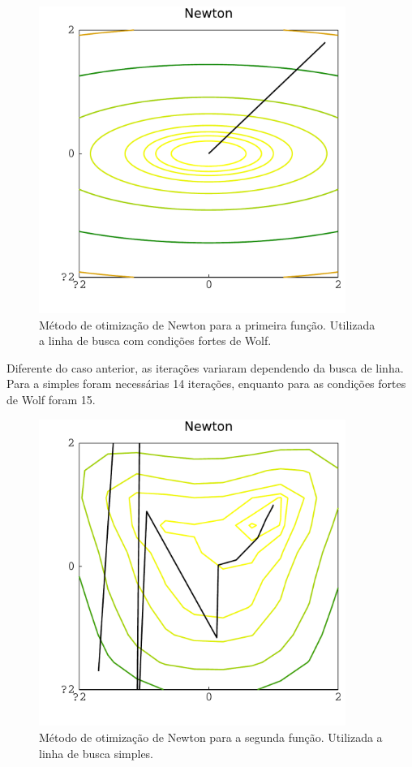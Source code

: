 \documentclass[12pt]{article}
\begin{document}
\begin{figure}[ht!]
	\centering
	\includegraphics[width=10cm]{Figuras/Newton_wolff2}
	\caption{Método de otimização de Newton para a primeira função. Utilizada a linha de busca com condições fortes de Wolf.} 
	\label{fig:new3}
\end{figure} 
Diferente do caso anterior, as iterações variaram dependendo da busca de linha. Para a simples foram necessárias 14 iterações, enquanto para as condições fortes de Wolf foram 15.
\begin{figure}[ht!]
	\centering
	\includegraphics[width=10cm]{Figuras/Newton_linef1}
	\caption{Método de otimização de Newton para a segunda função. Utilizada a linha de busca simples.} 
	\label{fig:new1f}
\end{figure} 
\end{document}
